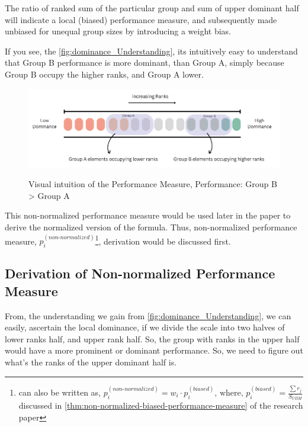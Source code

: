 \documentclass[a4paper,fleqn,review]{cas-sc}
\begin{document}
\begin{pot}[\ref{thm:non-normalized-performance-measure}]
	The ratio of ranked sum of the particular group and sum of upper dominant half will indicate a local (biased) performance measure, and subsequently made unbiased for unequal group sizes by introducing a weight bias.
\end{pot}

If you see, the \autoref{fig:dominance_Understanding}, its intuitively easy to understand that Group B performance is more dominant, than Group A, simply because Group B occupy the higher ranks, and Group A lower.
\begin{figure}
    \caption{Visual intuition of the Performance Measure, Performance: Group B > Group A}
    \centering
    \includegraphics[scale=0.65]{dominance-intuition.png}
    \label{fig:dominance_Understanding}
\end{figure}

This non-normalized performance measure would be used later in the paper to derive the normalized version of the formula. Thus, non-normalized performance measure, $p_i^{(non\text{-}normalized)}$\footnote{
	can also be written as, $p_i^{(non\text{-}normalized)} = w_i \cdot p_i^{(biased)} \text{, where, } p_i^{(biased)}= \frac{\sum r_j}{ S_{UDH} }$ discussed in \autoref{thm:non-normalized-biased-performance-measure} of the research paper}, derivation would be discussed first.

\subsection{Derivation of Non-normalized Performance Measure}

From, the understanding we gain from \autoref{fig:dominance_Understanding}, we can easily, ascertain the local dominance, if we divide the scale into two halves of lower ranks half, and upper rank half. So, the group with ranks in the upper half would have a more prominent or dominant performance. So, we need to figure out what's the ranks of the upper dominant half is.
\end{document}
